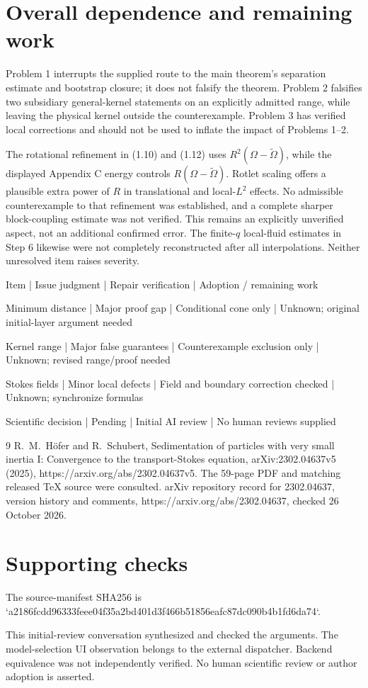 \documentclass[10pt]{article}
\begin{document}
\section*{Overall dependence and remaining work}
Problem 1 interrupts the supplied route to the main theorem’s separation estimate and bootstrap closure; it does not falsify the theorem. Problem 2 falsifies two subsidiary general-kernel statements on an explicitly admitted range, while leaving the physical kernel outside the counterexample. Problem 3 has verified local corrections and should not be used to inflate the impact of Problems 1–2.\par
The rotational refinement in (1.10) and (1.12) uses \(R^2(\Omega-\widetilde\Omega)\), while the displayed Appendix C energy controls \(R(\Omega-\widetilde\Omega)\). Rotlet scaling offers a plausible extra power of \(R\) in translational and local-\(L^2\) effects. No admissible counterexample to that refinement was established, and a complete sharper block-coupling estimate was not verified. This remains an explicitly unverified aspect, not an additional confirmed error. The finite-\(q\) local-fluid estimates in Step 6 likewise were not completely reconstructed after all interpolations. Neither unresolved item raises severity.\par
Item | Issue judgment | Repair verification | Adoption / remaining work\par
Minimum distance | Major proof gap | Conditional cone only | Unknown; original initial-layer argument needed\par
Kernel range | Major false guarantees | Counterexample exclusion only | Unknown; revised range/proof needed\par
Stokes fields | Minor local defects | Field and boundary correction checked | Unknown; synchronize formulas\par
Scientific decision | Pending | Initial AI review | No human reviews supplied\par
9 R. M. Höfer and R. Schubert, Sedimentation of particles with very small inertia I: Convergence to the transport-Stokes equation, arXiv:2302.04637v5 (2025), https://arxiv.org/abs/2302.04637v5. The 59-page PDF and matching released TeX source were consulted. arXiv repository record for 2302.04637, version history and comments, https://arxiv.org/abs/2302.04637, checked 26 October 2026.\par
\section*{Supporting checks}
The source-manifest SHA256 is `a2186fcdd96333feee04f35a2bd401d3f466b51856eafc87dc090b4b1fd6da74`.\par
This initial-review conversation synthesized and checked the arguments. The model-selection UI observation belongs to the external dispatcher. Backend equivalence was not independently verified. No human scientific review or author adoption is asserted.\par
\end{document}
